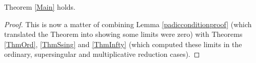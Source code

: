 \documentclass[12pt,letterpaper]{article}
\begin{document}
	\begin{thm}
		Theorem \ref{Main} holds.
	\end{thm}
	
	\begin{proof}
		This is now a matter of combining Lemma \ref{padicconditionproof} (which translated the Theorem into showing some limits were zero) with Theorems \ref{ThmOrd}, \ref{ThmSsing} and \ref{ThmInfty} (which computed these limits in the ordinary, supersingular and multiplicative reduction cases).
	\end{proof}
	
	












\printbibliography
\end{document}
